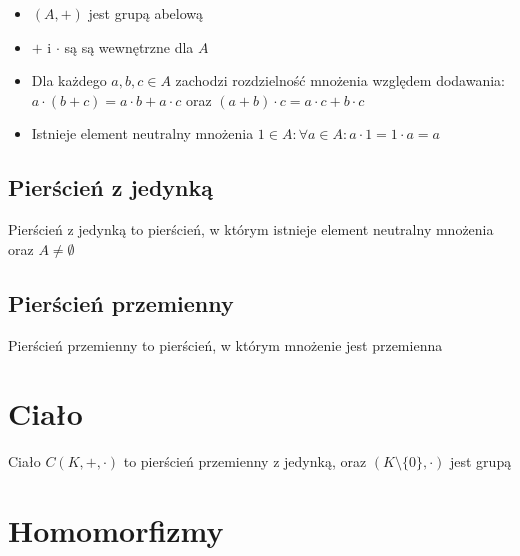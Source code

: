\documentclass{../notatki}
\begin{document}
\begin{itemize}
    \item $(A, +)$ jest grupą abelową
    \item $+$ i $\cdot$ są są wewnętrzne dla $A$
    \item Dla każdego $a, b, c \in A$ zachodzi rozdzielność mnożenia względem dodawania: $a \cdot (b + c) = a \cdot b + a \cdot c$ oraz $(a + b) \cdot c = a \cdot c + b \cdot c$
    \item Istnieje element neutralny mnożenia $1 \in A: \forall a \in A: a \cdot 1 = 1 \cdot a = a$
\end{itemize}

\subsection{Pierścień z jedynką}

Pierścień z jedynką to pierścień, w którym istnieje element neutralny mnożenia oraz $A \ne \emptyset$

\subsection{Pierścień przemienny}

Pierścień przemienny to pierścień, w którym mnożenie jest przemienna

\section{Ciało}

Ciało $C(K, +, \cdot)$ to pierścień przemienny z jedynką, oraz $(K \setminus \{0\}, \cdot)$ jest grupą

\section{Homomorfizmy}

\subsection{}
\end{document}
